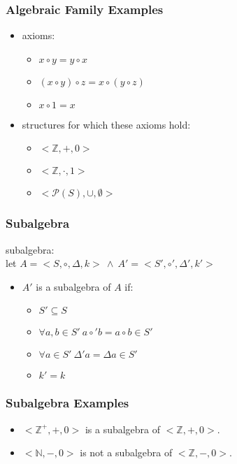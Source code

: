 \documentclass[dvipsnames]{beamer}
\begin{document}
\begin{frame}
  \frametitle{Algebraic Family Examples}

  \begin{example}
    \begin{itemize}
      \item axioms:
      \begin{itemize}
        \item $x \circ y = y \circ x$
        \item $(x \circ y) \circ z = x \circ (y \circ z)$
        \item $x \circ 1 = x$
      \end{itemize}

      \pause
      \item structures for which these axioms hold:
      \begin{itemize}
       \item $<\mathbb{Z},+,0>$
       \item $<\mathbb{Z},\cdot,1>$
       \item $<\mathcal{P}(S),\cup,\emptyset>$
      \end{itemize}
    \end{itemize}
  \end{example}
\end{frame}

\begin{frame}
  \frametitle{Subalgebra}

  \begin{definition}
    \alert{subalgebra}:\\
    let $A = <S,\circ,\Delta,k>~\wedge~A' = <S',\circ',\Delta',k'>$

    \pause
    \medskip
    \begin{itemize}
      \item $A'$ is a subalgebra of $A$ if:
      \begin{itemize}
        \item $S' \subseteq S$
        \item $\forall a,b \in S'~a \circ' b = a \circ b \in S'$
        \item $\forall a \in S'~\Delta' a = \Delta a \in S'$
        \item $k' = k$
      \end{itemize}
    \end{itemize}
  \end{definition}
\end{frame}

\begin{frame}
  \frametitle{Subalgebra Examples}

  \begin{example}
    \begin{itemize}
      \item $<\mathbb{Z}^+,+,0>$ is a subalgebra of $<\mathbb{Z},+,0>$.
      \pause
      \item $<\mathbb{N},-,0>$ is not a subalgebra of $<\mathbb{Z},-,0>$.
    \end{itemize}
  \end{example}
\end{frame}
\end{document}
